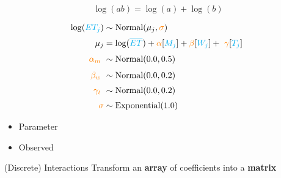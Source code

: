 \documentclass[aspectratio=169,xcolor=svgnames]{beamer}
\begin{document}
\begin{frame}
  \begin{equation*}
    \log(ab) = \log(a) + \log(b)
  \end{equation*}
\end{frame}

\begin{frame}[fragile]
  \begin{align*}
    \log(\observed{ET_j}) &\sim \text{Normal}(\mu_j, \parameter{\sigma})\\
    \mu_j &= \log(\observed{\overline{ET}}) + \parameter{\alpha}[\observed{M_j}] + \parameter{\beta}[\observed{W_j}] + \markmath{arrayaccess}{\parameter{\gamma}[\observed{T_j}]}\\
    \markmath{alpha}{\parameter{\alpha_m}} &\sim \normal{0.0, 0.5}\\
    \markmath{beta}{\parameter{\beta_w}} &\sim \normal{0.0, 0.2}\\
    \markmath{gamma}{\parameter{\gamma_t}} &\sim \normal{0.0, 0.2}\\
    \parameter{\sigma} &\sim \exponential{1.0}\\
  \end{align*}


  \begin{itemize}
  \item {} Parameter
  \item {} Observed
  \end{itemize}
\end{frame}

\begin{frame}
  \begin{block}{(Discrete) Interactions}
    Transform an \textbf{array} of coefficients into a \textbf{matrix}
  \end{block}
\end{frame}
\end{document}
